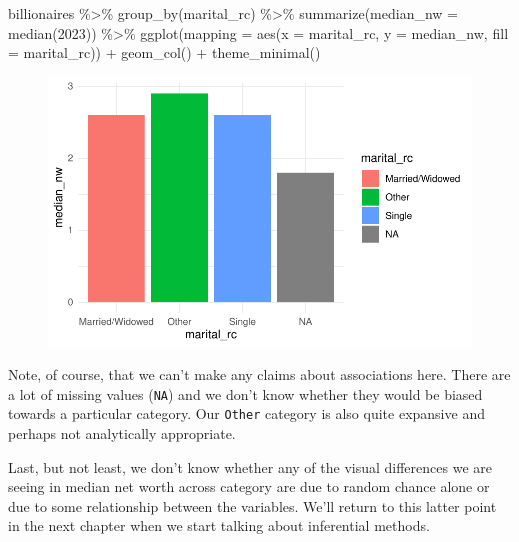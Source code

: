 \documentclass[
  letterpaper,
]{book}
\newenvironment{Shaded}{\begin{snugshade}}{\end{snugshade}}
\newcommand{\AttributeTok}[1]{\textcolor[rgb]{0.40,0.45,0.13}{#1}}
\newcommand{\FunctionTok}[1]{\textcolor[rgb]{0.28,0.35,0.67}{#1}}
\newcommand{\NormalTok}[1]{\textcolor[rgb]{0.00,0.23,0.31}{#1}}
\newcommand{\SpecialCharTok}[1]{\textcolor[rgb]{0.37,0.37,0.37}{#1}}
\newcommand{\StringTok}[1]{\textcolor[rgb]{0.13,0.47,0.30}{#1}}
\begin{document}
\begin{Shaded}
\begin{Highlighting}[]
\NormalTok{billionaires }\SpecialCharTok{\%\textgreater{}\%}
  \FunctionTok{group\_by}\NormalTok{(marital\_rc) }\SpecialCharTok{\%\textgreater{}\%}
  \FunctionTok{summarize}\NormalTok{(}\AttributeTok{median\_nw =} \FunctionTok{median}\NormalTok{(}\StringTok{\textasciigrave{}}\AttributeTok{2023}\StringTok{\textasciigrave{}}\NormalTok{)) }\SpecialCharTok{\%\textgreater{}\%}
  \FunctionTok{ggplot}\NormalTok{(}\AttributeTok{mapping =} \FunctionTok{aes}\NormalTok{(}\AttributeTok{x =}\NormalTok{ marital\_rc,}
                       \AttributeTok{y =}\NormalTok{ median\_nw,}
                       \AttributeTok{fill =}\NormalTok{ marital\_rc)) }\SpecialCharTok{+}
  \FunctionTok{geom\_col}\NormalTok{() }\SpecialCharTok{+} \FunctionTok{theme\_minimal}\NormalTok{()}
\end{Highlighting}
\end{Shaded}

\begin{figure}[H]

{\centering \includegraphics{workflows-and-wrangling_files/figure-pdf/unnamed-chunk-29-1.pdf}

}

\end{figure}

Note, of course, that we can't make any claims about associations here.
There are a lot of missing values (\texttt{NA}) and we don't know
whether they would be biased towards a particular category. Our
\texttt{Other} category is also quite expansive and perhaps not
analytically appropriate.

Last, but not least, we don't know whether any of the visual differences
we are seeing in median net worth across category are due to random
chance alone or due to some relationship between the variables. We'll
return to this latter point in the next chapter when we start talking
about inferential methods.
\end{document}

